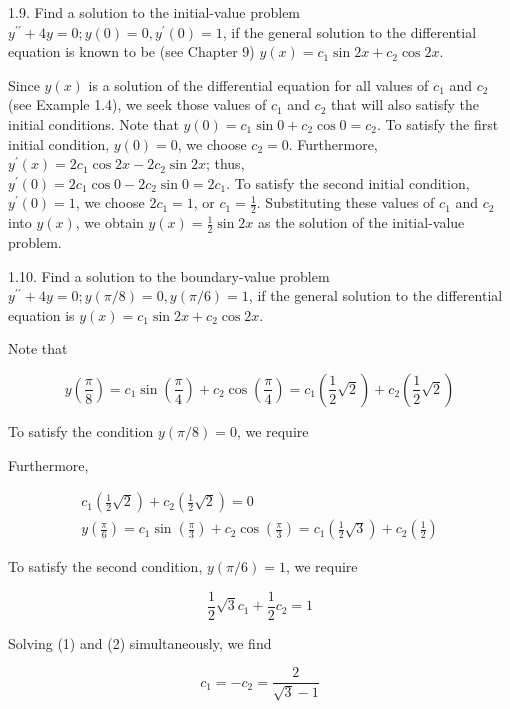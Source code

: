 \documentclass[10pt]{article}
\begin{document}
1.9. Find a solution to the initial-value problem $y^{\prime \prime}+4 y=0 ; y(0)=0, y^{\prime}(0)=1$, if the general solution to the differential equation is known to be (see Chapter 9) $y(x)=c_{1} \sin 2 x+c_{2} \cos 2 x$.

Since $y(x)$ is a solution of the differential equation for all values of $c_{1}$ and $c_{2}$ (see Example 1.4), we seek those values of $c_{1}$ and $c_{2}$ that will also satisfy the initial conditions. Note that $y(0)=c_{1} \sin 0+c_{2} \cos 0=c_{2}$. To satisfy the first initial condition, $y(0)=0$, we choose $c_{2}=0$. Furthermore, $y^{\prime}(x)=2 c_{1} \cos 2 x-2 c_{2} \sin 2 x$; thus,\\
$y^{\prime}(0)=2 c_{1} \cos 0-2 c_{2} \sin 0=2 c_{1}$. To satisfy the second initial condition, $y^{\prime}(0)=1$, we choose $2 c_{1}=1$, or $c_{1}=\frac{1}{2}$. Substituting these values of $c_{1}$ and $c_{2}$ into $y(x)$, we obtain $y(x)=\frac{1}{2} \sin 2 x$ as the solution of the initial-value problem.

1.10. Find a solution to the boundary-value problem $y^{\prime \prime}+4 y=0 ; y(\pi / 8)=0, y(\pi / 6)=1$, if the general solution to the differential equation is $y(x)=c_{1} \sin 2 x+c_{2} \cos 2 x$.

Note that

$$
y\left(\frac{\pi}{8}\right)=c_{1} \sin \left(\frac{\pi}{4}\right)+c_{2} \cos \left(\frac{\pi}{4}\right)=c_{1}\left(\frac{1}{2} \sqrt{2}\right)+c_{2}\left(\frac{1}{2} \sqrt{2}\right)
$$

To satisfy the condition $y(\pi / 8)=0$, we require

Furthermore,


\begin{gather*}
c_{1}\left(\frac{1}{2} \sqrt{2}\right)+c_{2}\left(\frac{1}{2} \sqrt{2}\right)=0  \tag{1}\\
y\left(\frac{\pi}{6}\right)=c_{1} \sin \left(\frac{\pi}{3}\right)+c_{2} \cos \left(\frac{\pi}{3}\right)=c_{1}\left(\frac{1}{2} \sqrt{3}\right)+c_{2}\left(\frac{1}{2}\right)
\end{gather*}


To satisfy the second condition, $y(\pi / 6)=1$, we require


\begin{equation*}
\frac{1}{2} \sqrt{3} c_{1}+\frac{1}{2} c_{2}=1 \tag{2}
\end{equation*}


Solving (1) and (2) simultaneously, we find

$$
c_{1}=-c_{2}=\frac{2}{\sqrt{3}-1}
$$
\end{document}
